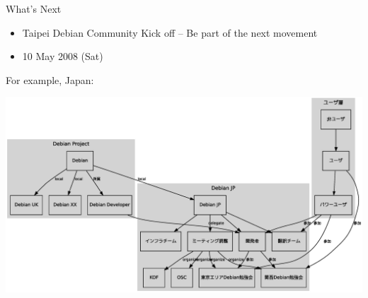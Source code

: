 \documentclass[cjk,dvipdfm,12pt]{beamer}
\begin{document}
\begin{frame}{What's Next}
 \begin{itemize}
  \item Taipei Debian Community Kick off 
	-- Be part of the next movement
  \item 10 May 2008 (Sat)
 \end{itemize}


For example, Japan:

\includegraphics[width=1\hsize]{image200712/debianmeetinganddebianjp.eps}

\end{frame}
\end{document}
